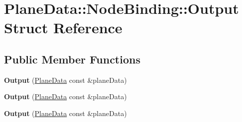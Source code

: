 \hypertarget{struct_plane_data_1_1_node_binding_1_1_output}{}\section{Plane\+Data\+:\+:Node\+Binding\+:\+:Output Struct Reference}
\label{struct_plane_data_1_1_node_binding_1_1_output}
\subsection*{Public Member Functions}
\begin{DoxyCompactItemize}
\item 
\mbox{\label{struct_plane_data_1_1_node_binding_1_1_output_a8fe48243aa3ffce9eb1f54656eabf411}} 
{\bfseries Output} (\hyperlink{class_plane_data}{Plane\+Data} const \&plane\+Data)
\item 
\mbox{\label{struct_plane_data_1_1_node_binding_1_1_output_a8fe48243aa3ffce9eb1f54656eabf411}} 
{\bfseries Output} (\hyperlink{class_plane_data}{Plane\+Data} const \&plane\+Data)
\item 
\mbox{\label{struct_plane_data_1_1_node_binding_1_1_output_a8fe48243aa3ffce9eb1f54656eabf411}} 
{\bfseries Output} (\hyperlink{class_plane_data}{Plane\+Data} const \&plane\+Data)
\end{DoxyCompactItemize}
